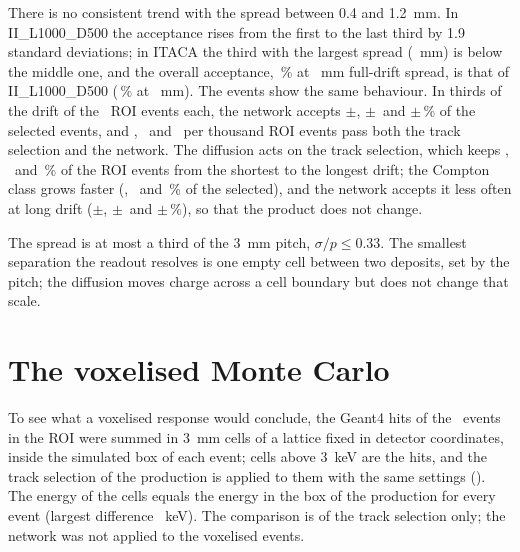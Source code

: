 \documentclass[11pt,a4paper]{article}
\newcommand{\code}[1]{\path{#1}}
\begin{document}
There is no consistent trend with the spread between 0.4 and 1.2~mm. In
II\_L1000\_D500 the acceptance rises from the first to the last third by
1.9 standard deviations; in ITACA the third with the largest spread
(\ThirdHybridThreeSigma~mm) is below the middle one, and the overall
acceptance, \ThirdHybridAll\,\% at \ThirdHybridFullSigma~mm full-drift spread,
is that of II\_L1000\_D500 (\ThirdPureAll\,\% at \ThirdPureFullSigma~mm).
The \BI events show the same behaviour. In thirds of the drift of the
\BiThirdRoi\ ROI events each, the network accepts
\BiThirdOneNet$\pm$\BiThirdOneNetErr, \BiThirdTwoNet$\pm$\BiThirdTwoNetErr\ and
\BiThirdThreeNet$\pm$\BiThirdThreeNetErr\,\% of the selected events, and
\BiThirdOnePerRoi, \BiThirdTwoPerRoi\ and \BiThirdThreePerRoi\ per thousand ROI
events pass both the track selection and the network. The diffusion acts on
the track selection, which keeps \BiThirdOneSel, \BiThirdTwoSel\ and
\BiThirdThreeSel\,\% of the ROI events from the shortest to the longest drift;
the Compton class grows faster (\BiThirdOneComptShare,
\BiThirdTwoComptShare\ and \BiThirdThreeComptShare\,\% of the selected), and
the network accepts it less often at long drift
(\BiThirdOneComptNet$\pm$\BiThirdOneComptNetErr,
\BiThirdTwoComptNet$\pm$\BiThirdTwoComptNetErr\ and
\BiThirdThreeComptNet$\pm$\BiThirdThreeComptNetErr\,\%), so that the product
does not change.

The spread is at most a third of the 3~mm pitch, $\sigma/p \le 0.33$. The
smallest separation the readout resolves is one empty cell between two
deposits, set by the pitch; the diffusion moves charge across a cell boundary
but does not change that scale.

\section{The voxelised Monte Carlo}
\label{sec:voxel}
To see what a voxelised response would conclude, the Geant4 hits of the
\VoxEvents\ \BI events in the ROI were summed in 3~mm cells of a lattice fixed
in detector coordinates, inside the simulated box of each event; cells above
3~keV are the hits, and the track selection of the production is applied to
them with the same settings (\code{scripts/iitaca/prepare_bi214_floor.jl}).
The energy of the cells equals the energy in the box of the production for
every event (largest difference \VoxBoxDiff~keV). The comparison is of the
track selection only; the network was not applied to the voxelised events.
\end{document}
